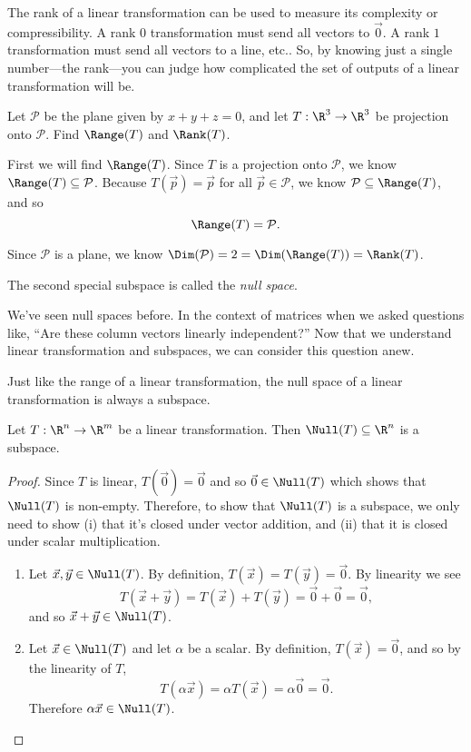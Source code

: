The rank of a linear transformation can be used to measure 
its complexity or compressibility. A rank $0$ transformation must send all vectors to $\vec 0$. A rank
$1$ transformation must send all vectors to a line, etc.. So, by knowing just a single number---the rank---you
can judge how complicated the set of outputs of a linear transformation will be.

\begin{example}
	Let $\mathcal P$ be the plane given by $x+y+z=0$, and let $T:\R^3\to\R^3$ be projection onto $\mathcal P$.
	Find $\Range(T)$ and $\Rank(T)$.

	\medskip
	First we will find $\Range(T)$. Since $T$ is a projection onto $\mathcal P$, we know $\Range(T)\subseteq \mathcal P$.
	Because $T(\vec p)=\vec p$ for all $\vec p\in \mathcal P$, we know $\mathcal P\subseteq \Range(T)$, and so
	\[
		\Range(T)=\mathcal P.
	\]

	Since $\mathcal P$ is a plane, we know $\Dim(\mathcal P)=2=\Dim(\Range(T))=\Rank(T)$.
\end{example}

The second special subspace is called the \emph{null space}.


We've seen null spaces before. In the context of matrices when we asked questions like, ``Are these column vectors
linearly independent?'' Now that we understand linear transformation and subspaces,
we can consider this question anew.

Just like the range of a linear transformation, the null space of a linear transformation is always a subspace.

\begin{theorem}
	Let $T:\R^n\to\R^m$ be a linear transformation. Then $\Null(T)\subseteq \R^n$ is a subspace.
\end{theorem}
\begin{proof}
	Since $T$ is linear, $T(\vec 0)=\vec 0$ and so $\vec 0\in\Null(T)$ which shows that $\Null(T)$ is non-empty.
	Therefore, to show that $\Null(T)$ is a subspace, we only need to show (i) that it's closed under vector addition,
	and (ii) that it is closed under scalar multiplication.
	\begin{enumerate}[label=(\roman*)]
		\item Let $\vec x,\vec y\in\Null(T)$.
			By definition, $T(\vec x)=T(\vec y)=\vec 0$. By linearity we see
			\[
				T(\vec x+\vec y)=T(\vec x)+T(\vec y)=\vec 0+\vec 0=\vec 0,
			\]
			and so $\vec x+\vec y\in\Null(T)$.
		\item Let $\vec x\in\Null(T)$ and let $\alpha$ be a scalar.
			By definition, $T(\vec x)=\vec 0$,
			and so by the linearity of $T$,
			\[
			T(\alpha\vec x)=\alpha T(\vec x)=\alpha\vec 0=\vec 0.
			\]
			Therefore $\alpha\vec x\in\Null(T)$.
	\end{enumerate}
\end{proof}

